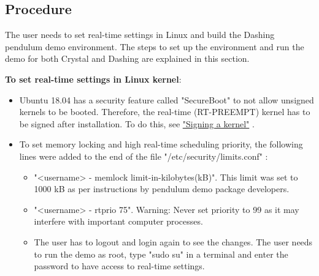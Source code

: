 \documentclass[%
xelatex,
	oneside,		%
	12pt,			%
	parskip=half,	%
	abstracton,
	chapterprefix=true%
    appendixprefix=true]
{scrbook}
\begin{document}
	\subsection{Procedure}	
\vspace*{0.5cm}
The user needs to set real-time settings in Linux and build the Dashing pendulum demo environment. The steps to set up the environment and run the demo for both Crystal and Dashing are explained in this section. 
\vspace*{0.25cm}


{\bfseries To set real-time settings in Linux kernel}:
\begin{itemize}
\item Ubuntu 18.04 has a security feature called "SecureBoot" to not allow unsigned kernels to be booted. Therefore, the real-time (RT-PREEMPT) kernel has to be signed after installation. To do this, see \href{https://askubuntu.com/questions/1081472/vmlinuz-4-18-12-041812-generic-has-invalid-signature}{"Signing a kernel"} \cite{dualboot}.
\item To set memory locking and high real-time scheduling priority, the following lines were added to the end of the file "/etc/security/limits.conf" :
\begin{itemize}
\item "<username>  - memlock limit-in-kilobytes(kB)". This limit was set to 1000 kB as per instructions by pendulum demo package developers.
\item "<username>  - rtprio 75". Warning: Never set priority to 99 as it may interfere with important computer processes.
\item The user has to logout and login again to see the changes. The user needs to run the demo as root, type "sudo su" in a terminal and enter the password to have access to real-time settings.
\end{itemize}
\end{itemize}
\end{document}
